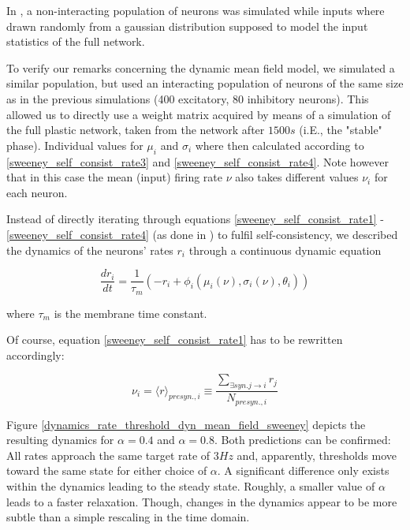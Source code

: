 \documentclass[10pt,a4paper]{article}
\begin{document}
In \cite{Sweeney_Paper}, a non-interacting population of neurons was simulated while inputs where drawn randomly from a gaussian distribution supposed to model the input statistics of the full network.

To verify our remarks concerning the dynamic mean field model, we simulated a similar population, but used an interacting population of neurons of the same size as in the previous simulations (400 excitatory, 80 inhibitory neurons). This allowed us to directly use a weight matrix acquired by means of a simulation of the full plastic network, taken from the network after $1500s$ (i.E., the "stable" phase).
Individual values for $\mu_i$ and $\sigma_i$ where then calculated according to \eqref{sweeney_self_consist_rate3} and \eqref{sweeney_self_consist_rate4}. Note however that in this case the mean (input) firing rate $\nu$ also takes different values $\nu_i$ for each neuron.

Instead of directly iterating through equations \eqref{sweeney_self_consist_rate1} - \eqref{sweeney_self_consist_rate4} (as done in \cite{Sweeney_Paper}) to fulfil self-consistency, we described the dynamics of the neurons' rates $r_i$ through a continuous dynamic equation

\begin{equation}
\frac{dr_i}{dt} = \frac{1}{\tau_m} \left( -r_i + \phi_i(\mu_i(\nu),\sigma_i(\nu),\theta_i) \right)
\label{dyn_rate_equation}
\end{equation}

where $\tau_m$ is the membrane time constant.

Of course, equation \eqref{sweeney_self_consist_rate1} has to be rewritten accordingly:

\begin{equation}
\nu_i = {\langle r \rangle}_{presyn.,i} \equiv \frac{\sum_{\exists syn. j\rightarrow i} r_j}{N_{presyn., i}}
\label{sweeney_self_consist_rate1_mod}
\end{equation}

Figure \ref{dynamics_rate_threshold_dyn_mean_field_sweeney} depicts the resulting dynamics for $\alpha=0.4$ and $\alpha = 0.8$. Both predictions can be confirmed: All rates approach the same target rate of $3Hz$ and, apparently, thresholds move toward the same state for either choice of $\alpha$. A significant difference only exists within the dynamics leading to the steady state. Roughly, a smaller value of $\alpha$ leads to a faster relaxation. Though, changes in the dynamics appear to be more subtle than a simple rescaling in the time domain.
\end{document}
